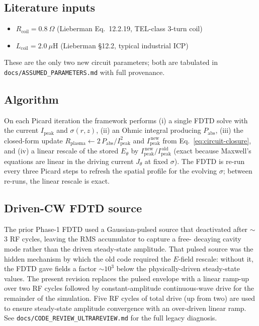 \subsection*{Literature inputs}

\begin{itemize}
  \item $R_\mathrm{coil} = 0.8~\Omega$ (Lieberman Eq.~12.2.19, TEL-class 3-turn coil)
  \item $L_\mathrm{coil} = 2.0~\mu\mathrm{H}$ (Lieberman §12.2, typical industrial ICP)
\end{itemize}
These are the only two new circuit parameters; both are tabulated in
\texttt{docs/ASSUMED\_PARAMETERS.md} with full provenance.

\subsection*{Algorithm}

On each Picard iteration the framework performs (i) a single FDTD solve
with the current $I_\mathrm{peak}$ and $\sigma(r,z)$, (ii) an Ohmic
integral producing $P_\mathrm{abs}$, (iii) the closed-form update
$R_\mathrm{plasma} \leftarrow 2\,P_\mathrm{abs}/I_\mathrm{peak}^2$ and
$I_\mathrm{peak}^{\,\text{new}}$ from Eq.~\ref{eq:circuit-closure}, and
(iv) a linear rescale of the stored $E_\theta$ by
$I_\mathrm{peak}^{\,\text{new}}/I_\mathrm{peak}^{\,\text{old}}$ (exact
because Maxwell's equations are linear in the driving current $J_\theta$
at fixed $\sigma$).  The FDTD is re-run every three Picard steps to
refresh the spatial profile for the evolving $\sigma$; between re-runs,
the linear rescale is exact.

\subsection*{Driven-CW FDTD source}

The prior Phase-1 FDTD used a Gaussian-pulsed source that deactivated
after $\sim$3 RF cycles, leaving the RMS accumulator to capture a free-
decaying cavity mode rather than the driven steady-state amplitude.  That
pulsed source was the hidden mechanism by which the old code required the
$E$-field rescale: without it, the FDTD gave fields a factor $\sim 10^3$
below the physically-driven steady-state values.  The present revision
replaces the pulsed envelope with a linear ramp-up over two RF cycles
followed by constant-amplitude continuous-wave drive for the remainder of
the simulation.  Five RF cycles of total drive (up from two) are used to
ensure steady-state amplitude convergence with an over-driven linear
ramp.  See \texttt{docs/CODE\_REVIEW\_ULTRAREVIEW.md} for the full
legacy diagnosis.

